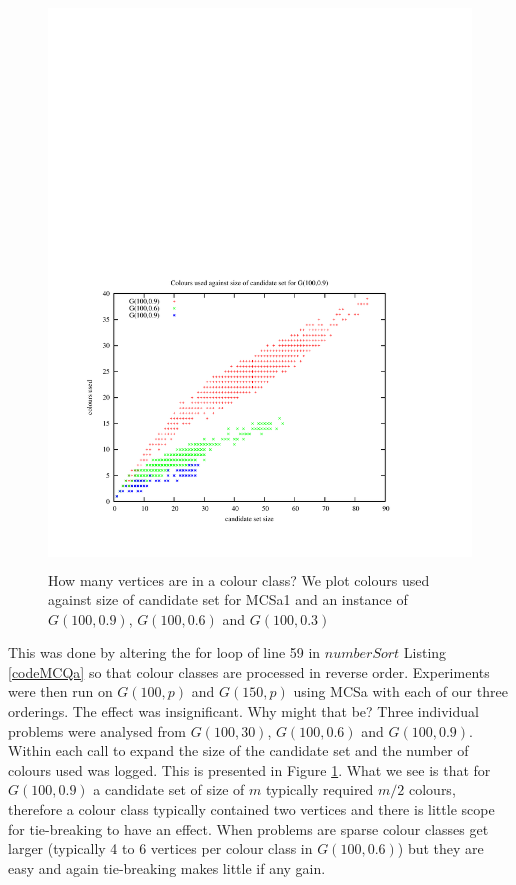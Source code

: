 \documentclass{l4proj}
\begin{document}
\begin{figure}
\vspace{-7cm}
\begin{center}
\includegraphics[height=15.0cm]{colClass.pdf}
\end{center}
\vspace{-1cm}
\caption{How many vertices are in a colour class? We plot colours used against size of candidate set for MCSa1 and an instance of $G(100,0.9)$,
$G(100,0.6)$ and $G(100,0.3)$}
\label{colClass}
\end{figure}

This was done by altering the for loop of line 59 in $numberSort$ Listing \ref{codeMCQa} so that colour classes are
processed in reverse order. Experiments were then run on $G(100,p)$ and
$G(150,p)$ using MCSa with each of our three orderings. The effect was insignificant. 
Why might that be? Three individual problems were analysed from $G(100,30)$, $G(100,0.6)$ and $G(100,0.9)$. 
Within each call to expand the size of the candidate set and the number of colours used was logged. This is 
presented in Figure \ref{colClass}. What we see is that
for $G(100,0.9)$ a candidate set of size of $m$ typically required $m/2$ colours, therefore a colour class typically
contained two vertices and there is little scope for tie-breaking to have an effect. When problems are sparse
colour classes get larger (typically 4 to 6 vertices per colour class in $G(100,0.6)$)
but they are easy and again tie-breaking makes little if any gain.
\end{document}
